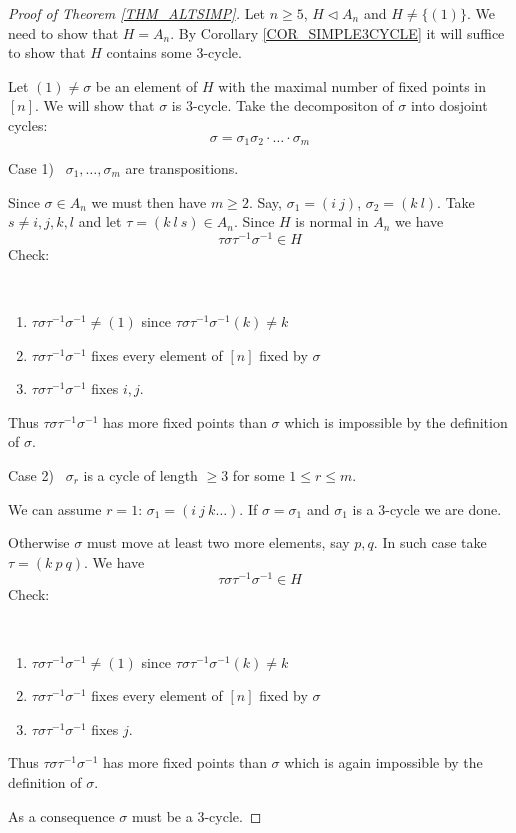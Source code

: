 \documentclass[12pt, letterpaper, oneside]{article}
\theoremstyle{plain}
\theoremstyle{definition}
\newcommand{\benu}{\begin{enumerate}}
\newcommand{\eenu}{\end{enumerate}}
\newcommand{\vs}{\vskip 5mm}
\newcommand{\isep}[1][0]{\setlength{\itemsep}{#1 mm}}
\begin{document}
\begin{proof}[Proof of Theorem \ref{THM_ALTSIMP}]
Let $n\geq 5$, $H\lhd A_{n}$ and $H \neq \{(1)\}$. We need to show that $H= A_{n}$.
By Corollary \ref{COR_SIMPLE3CYCLE} it will suffice to show that $H$ contains 
some 3-cycle.

Let $(1)\neq \sigma$ be an element of $H$ with the maximal number of fixed points in $[n]$.
We will show that $\sigma$ is 3-cycle. Take the decompositon of $\sigma$ into dosjoint 
cycles:
$$\sigma = \sigma_{1}\sigma_{2}\cdot {\dots}\cdot \sigma_{m}$$

Case 1) \ $\sigma_{1}, \dots, \sigma_{m}$ are transpositions. 

Since $\sigma\in A_{n}$ we must then have $m\geq 2$. Say,  $\sigma_{1} = (i\ j)$, $\sigma_{2} = (k\ l)$. 
Take $s\neq i, j, k, l$ and let $\tau=(k\ l\ s)\in A_{n}$. Since $H$ is normal in $A_{n}$ we have 
$$\tau\sigma\tau^{-1}\sigma^{-1} \in H$$ 
Check:


\vskip -13mm

\ 
\benu
\isep
\item  $\tau\sigma\tau^{-1}\sigma^{-1} \neq (1)$ since $\tau\sigma\tau^{-1}\sigma^{-1}(k)\neq k$
\item  $\tau\sigma\tau^{-1}\sigma^{-1}$ fixes every element of $[n]$ fixed by $\sigma$
\item $\tau\sigma\tau^{-1}\sigma^{-1}$ fixes $i, j$.
\eenu
 
 Thus $\tau\sigma\tau^{-1}\sigma^{-1}$ has more fixed points than $\sigma$ which is impossible 
 by the definition of $\sigma$.

\vs

Case 2) \ $\sigma_{r} $ is a cycle of length $\geq 3$ for some $1\leq r \leq m$. 

We can assume $r=1$: $\sigma_{1} = (i\ j\ k \dots)$. If $\sigma = \sigma_{1}$ and $\sigma_{1}$
is a 3-cycle we are done. 

Otherwise $\sigma$ must move at least two more elements, say $p, q$. In such case take $\tau= (k \ p \ q)$. We have  
$$\tau\sigma\tau^{-1}\sigma^{-1}  \in H$$
 Check:


\vskip -13mm

\ 
\benu
\isep
\item  $\tau\sigma\tau^{-1}\sigma^{-1} \neq (1)$ since $\tau\sigma\tau^{-1}\sigma^{-1}(k)\neq k$
\item  $\tau\sigma\tau^{-1}\sigma^{-1}$ fixes every element of $[n]$ fixed by $\sigma$
\item $\tau\sigma\tau^{-1}\sigma^{-1}$ fixes $j$.
\eenu

 Thus $\tau\sigma\tau^{-1}\sigma^{-1}$ has more fixed points than $\sigma$ which is again impossible 
 by the definition of $\sigma$.
 
 As a consequence $\sigma$ must be a 3-cycle. 
 
\end{proof}
\end{document}
